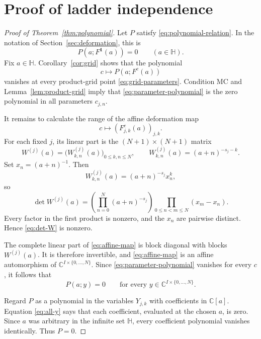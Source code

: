 \documentclass[11pt,reqno]{amsart}
\theoremstyle{definition}
\theoremstyle{remark}
\newcommand{\C}{\mathbb C}
\newcommand{\HH}{\mathbb H}
\newcommand{\mc}{\mathrm{MC}}
\begin{document}
\section{Proof of ladder independence}\label{sec:main-proof}

\begin{proof}[Proof of Theorem~\ref{thm:polynomial}]
Let $P$ satisfy \eqref{eq:polynomial-relation}.  In the notation of
Section~\ref{sec:deformation}, this is
\[
  P(a;F^{\mathbf1}(a))=0\qquad(a\in\HH).
\]
Fix $a\in\HH$.  Corollary~\ref{cor:grid} shows that the polynomial
\begin{equation}\label{eq:parameter-polynomial}
  c\longmapsto P(a;F^c(a))
\end{equation}
vanishes at every product-grid point \eqref{eq:grid-parameters}.  Condition
$\mc$ and Lemma~\ref{lem:product-grid} imply that
\eqref{eq:parameter-polynomial} is the zero polynomial in all parameters
$c_{j,n}$.

It remains to calculate the range of the affine deformation map
\begin{equation}\label{eq:affine-map}
  c\longmapsto(F_{j,k}^c(a))_{j,k}.
\end{equation}
For each fixed $j$, its linear part is the $(N+1)\times(N+1)$ matrix
\begin{equation}\label{eq:W}
  W^{(j)}(a)=\bigl(W^{(j)}_{k,n}(a)\bigr)_{0\leq k,n\leq N},
  \qquad
  W^{(j)}_{k,n}(a)=(a+n)^{-s_j-k}.
\end{equation}
Set $x_n=(a+n)^{-1}$.  Then
\[
  W^{(j)}_{k,n}(a)=(a+n)^{-s_j}x_n^k,
\]
so
\begin{equation}\label{eq:det-W}
  \det W^{(j)}(a)
  =\left(\prod_{n=0}^{N}(a+n)^{-s_j}\right)
   \prod_{0\leq n<m\leq N}(x_m-x_n).
\end{equation}
Every factor in the first product is nonzero, and the $x_n$ are pairwise
distinct.  Hence \eqref{eq:det-W} is nonzero.

The complete linear part of \eqref{eq:affine-map} is block diagonal with
blocks $W^{(j)}(a)$.  It is therefore invertible, and
\eqref{eq:affine-map} is an affine automorphism of
$\C^{I\times\{0,\ldots,N\}}$.  Since \eqref{eq:parameter-polynomial}
vanishes for every $c$, it follows that
\begin{equation}\label{eq:all-y}
  P(a;y)=0
  \qquad
  \text{for every }y\in\C^{I\times\{0,\ldots,N\}}.
\end{equation}

Regard $P$ as a polynomial in the variables $Y_{j,k}$ with coefficients in
$\C[a]$.  Equation \eqref{eq:all-y} says that each coefficient, evaluated at
the chosen $a$, is zero.  Since $a$ was arbitrary in the infinite set
$\HH$, every coefficient polynomial vanishes identically.  Thus $P=0$.
\end{proof}
\end{document}
